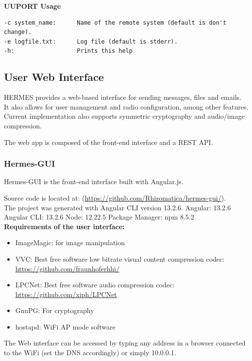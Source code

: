 \textbf{UUPORT Usage}
\begin{verbatim}
-c system_name:      Name of the remote system (default is don't change).
-e logfile.txt:      Log file (default is stderr).
-h:                  Prints this help
\end{verbatim}
\subsection{User Web Interface}

HERMES provides a web-based interface for sending messages, files and emails. It also allows for user management and radio configuration, among other features.
Current implementation also supports symmetric cryptography and audio/image compression.

The web app is composed of the front-end interface and a REST API.

\subsubsection{Hermes-GUI}
Hermes-GUI is the front-end interface built with Angular.js.

Source code is located at:
(\url{https://github.com/Rhizomatica/hermes-gui/}).\\

The project was generated with Angular CLI version 13.2.6.
Angular: 13.2.6 Angular CLI: 13.2.6 Node: 12.22.5 Package Manager: npm 8.5.2\\

\textbf{Requirements of the user interface:}

\begin{itemize}
\item ImageMagic: for image manipulation
\item VVC: Best free software low bitrate visual content compression codec: \url{https://github.com/fraunhoferhhi/}
\item LPCNet: Best free software audio compression codec: \url{https://github.com/xiph/LPCNet}
\item GnuPG: For cryptography
\item hostapd: WiFi AP mode software
\end{itemize}

The Web interface can be accessed by typing any address in a browser
connected to the WiFi (set the DNS accordingly) or simply 10.0.0.1.\\


